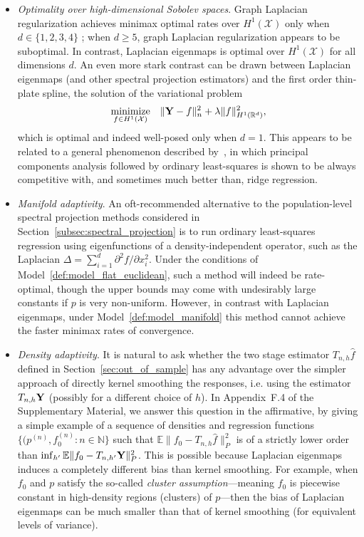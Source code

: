 \documentclass[aos]{imsart}
\theoremstyle{plain}
\theoremstyle{definition}
\theoremstyle{remark}
\def\R{\mathbb{R}}
\newcommand{\Ebb}{\mathbb{E}}
\newcommand{\wh}[1]{\widehat{#1}}
\newcommand{\mc}[1]{\mathcal{#1}}
\newcommand{\Reals}{\mathbb{R}} %
\newcommand{\1}{\mathbf{1}}
\begin{document}
\begin{itemize}
	\item \emph{Optimality over high-dimensional Sobolev spaces}. Graph Laplacian regularization achieves minimax optimal rates over $H^1(\mc{X})$ only when $d \in \{1,2,3,4\}$ \citep{sadhanala16, green2021}; when $d \geq 5$, graph Laplacian regularization appears to be suboptimal. In contrast, Laplacian eigenmaps is optimal over $H^1(\mc{X})$ for all dimensions $d$.  An even more stark contrast can be drawn between Laplacian eigenmaps (and other spectral projection estimators) and the first order thin-plate spline, the solution of the variational problem
	\begin{equation}
	\underset{f \in H^1(\mc{X})}{\textrm{minimize}} \quad  \|{\bf Y} - f\|_n^2 + \lambda \|f\|_{H^1(\Reals^d)}^2,
	\end{equation}
	which is optimal and indeed well-posed only when $d = 1$. This appears to be related to a general phenomenon described by~\cite{dhillon2013,dicker2017}, in which principal components analysis followed by ordinary least-squares is shown to be always competitive with, and sometimes much better than, ridge regression. 
	\item \emph{Manifold adaptivity}. An oft-recommended alternative to the population-level spectral projection methods considered in Section~\ref{subsec:spectral_projection} is to run ordinary least-squares regression using eigenfunctions of a density-independent operator, such as the Laplacian $\Delta = \sum_{i = 1}^{d} \partial^2f/\partial x_i^2$. Under the conditions of Model~\ref{def:model_flat_euclidean}, such a method will indeed be rate-optimal, though the upper bounds may come with undesirably large constants if $p$ is very non-uniform. However, in contrast with Laplacian eigenmaps, under Model~\ref{def:model_manifold} this method cannot achieve the faster minimax rates of convergence.
	\item \emph{Density adaptivity}. It is natural to ask whether the two stage estimator $T_{n,h}\wh{f}$ defined in Section~\ref{sec:out_of_sample} has any advantage over the simpler approach of directly kernel smoothing the responses, i.e. using the estimator $T_{n,h}{\bf Y}$ (possibly for a different choice of $h$). In Appendix~F.4 of the Supplementary Material, we answer this question in the affirmative, by giving a simple example of a sequence of densities and regression functions $\{(p^{(n)}, f_0^{(n)}: n \in \mathbb{N}\}$ such that $\Ebb\|f_0 - T_{n,h}\wh{f}\|_P^2$ is of a strictly lower order than $\inf_{h'} \Ebb\|f_0 - T_{n,h'}{\bf Y}\|_P^2$. This is possible because Laplacian eigenmaps induces a completely different bias than kernel smoothing. For example, when $f_0$ and $p$ satisfy the so-called \emph{cluster assumption}---meaning $f_0$ is piecewise constant in high-density regions (clusters) of $p$---then the bias of Laplacian eigenmaps can be much smaller than that of kernel smoothing (for equivalent levels of variance). 
	

\end{itemize}
\end{document}
